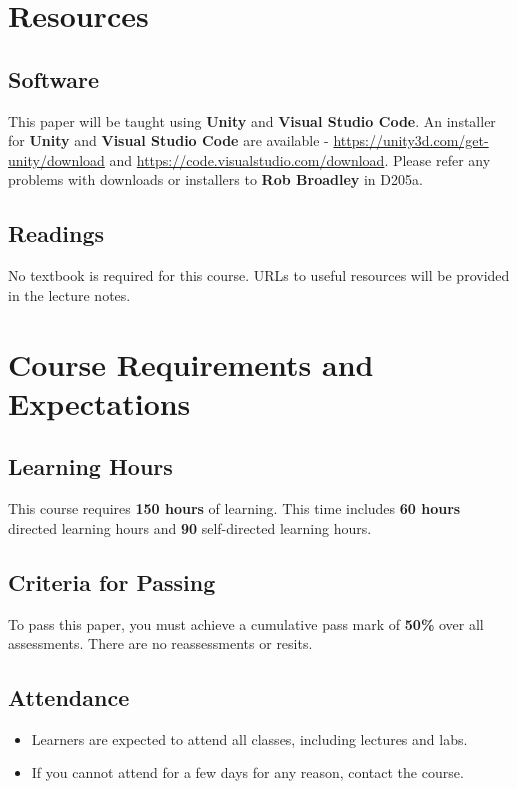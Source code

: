 \documentclass{article}
\begin{document}
\section*{Resources}

\subsection*{Software}
This paper will be taught using \textbf{Unity} and \textbf{Visual Studio Code}. An installer for \textbf{Unity} and \textbf{Visual Studio Code} are available - \href{https://unity3d.com/get-unity/download}{https://unity3d.com/get-unity/download} and \href{https://code.visualstudio.com/download}{https://code.visualstudio.com/download}. Please refer any problems with downloads or installers to \textbf{Rob Broadley} in D205a.

\subsection*{Readings}
No textbook is required for this course. URLs to useful resources will be provided in the lecture notes.

\section*{Course Requirements and Expectations}

\subsection*{Learning Hours}
This course requires \textbf{150 hours} of learning. This time includes \textbf{60 hours} directed learning hours and \textbf{90} self-directed learning hours.

\subsection*{Criteria for Passing}
To pass this paper, you must achieve a cumulative pass mark of \textbf{50\%} over all assessments. There are no reassessments or resits.

\subsection*{Attendance}
\begin{itemize}
	\item Learners are expected to attend all classes, including lectures and labs.
	\item If you cannot attend for a few days for any reason, contact the course.
\end{itemize}
\end{document}
